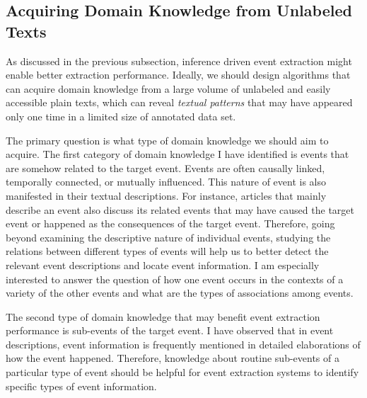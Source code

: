 \subsection{Acquiring Domain Knowledge from Unlabeled Texts}
\label{knowledge-types}

As discussed in the previous subsection, 
inference driven event extraction might enable better extraction performance.
Ideally, we should design algorithms that can acquire 
domain knowledge 
from a large 
volume of unlabeled and easily accessible plain texts,  
which can reveal {\it textual patterns} that may have appeared 
only one time in a limited size of annotated data set.


The primary question is what type of domain knowledge 
 we should aim to acquire. 
The first category of domain knowledge I have identified 
is events that are somehow related to the target event.   
Events are often causally
linked, temporally connected, or mutually influenced. 
This nature of event 
is also manifested in their textual descriptions. 
For instance, articles that mainly describe an event also 
discuss its related events that may have caused 
the target event or happened as the consequences of the target event.
Therefore, going beyond examining the descriptive nature 
of individual events, studying the relations between different 
types of events will help us to 
better detect the relevant event 
descriptions and locate event information. 
I am especially interested to answer the question of 
how one event occurs in the contexts of a variety of
the other events and what are the types of associations among events.

The second type of domain knowledge that 
may benefit event extraction performance is sub-events of the 
target event. 
I have observed that in event descriptions, 
event information is frequently mentioned in 
detailed 
elaborations 
of how the event happened. 
Therefore, knowledge about routine sub-events of a particular type of event 
should be helpful for event extraction systems to identify 
specific types of event information. 


